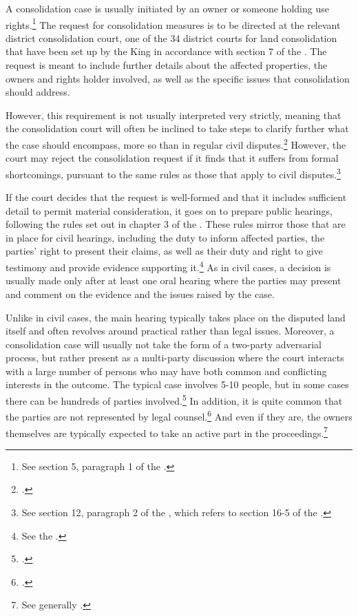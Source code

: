 A consolidation case is usually initiated by an owner or someone holding use rights.\footnote{See section 5, paragraph 1 of the \dni\cite{lca79}.} The request for consolidation measures is to be directed at the relevant district consolidation court, one of the 34 district courts for land consolidation that have been set up by the King in accordance with section 7 of the \cite{lca79}. The request is meant to include further details about the affected properties, the owners and rights holder involved, as well as the specific issues that consolidation should address.

However, this requirement is not usually interpreted very strictly, meaning that the consolidation court will often be inclined to take steps to clarify further what the case should encompass, more so than in regular civil disputes.\footcite[39]{langbach09} However, the court may reject the consolidation request if it finds that it suffers from formal shortcomings, pursuant to the same rules as those that apply to civil disputes.\footnote{See section 12, paragraph 2 of the \cite{lca79}, which refers to section 16-5 of the \cite{cda05}.}

If the court decides that the request is well-formed and that it includes sufficient detail to permit material consideration, it goes on to prepare public hearings, following the rules set out in chapter 3 of the \cite{lca79}. These rules mirror those that are in place for civil hearings, including the duty to inform affected parties, the parties' right to present their claims, as well as their duty and right to give testimony and provide evidence supporting it.\footnote{See the \dni\cite[13|15|17 a)|18]{lca79}.} As in civil cases, a decision is usually made only after at least one oral hearing where the parties may present and comment on the evidence and the issues raised by the case.

Unlike in civil cases, the main hearing typically takes place on the disputed land itself and often revolves around practical rather than legal issues. Moreover, a consolidation case will usually not take the form of a two-party adversarial process, but rather present as a multi-party discussion where the court interacts with a large number of persons who may have both common and conflicting interests in the outcome. The typical case involves 5-10 people, but in some cases there can be hundreds of parties involved.\footcite[39]{langbach09} In addition, it is quite common that the parties are not represented by legal counsel.\footcite[109-111]{rognes00} And even if they are, the owners themselves are typically expected to take an active part in the proceedings.\footnote{See generally \cite{rognes00}.}

